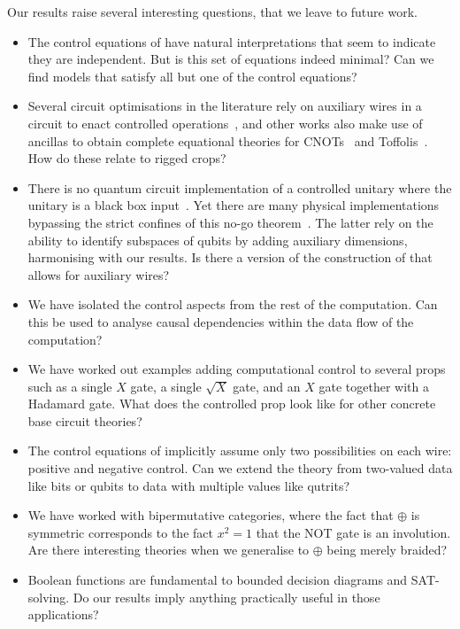 \documentclass[a4paper]{article}
\theoremstyle{plain}
\theoremstyle{definition}
\begin{document}
Our results raise several interesting questions, that we leave to future work.
\begin{itemize}
	\item The control equations of  have natural interpretations that seem to indicate they are independent. But is this set of equations indeed minimal? Can we find models that satisfy all but one of the control equations?

	\item Several circuit optimisations in the literature rely on auxiliary
		wires in a circuit to enact controlled
		operations~\cite{clementetal:minimal,clementetal:extensions}, and other
		works also make use of ancillas to obtain complete equational theories
		for CNOTs~\cite{cockettetal:cnot} and
		Toffolis~\cite{cockettcomfort:tof}. How do these relate to rigged
		crops?

	\item There is no quantum circuit implementation of a controlled unitary where the unitary is a black box input~\cite{araujoetal:nocontrol}. Yet there are many physical implementations bypassing the strict confines of this no-go theorem~\cite{friisetal:unknowncontrol,bisioetal:conditional}. The latter rely on the ability to identify subspaces of qubits by adding auxiliary dimensions, harmonising with our results. Is there a version of the construction of  that allows for auxiliary wires?

	\item We have isolated the control aspects from the rest of the computation. Can this be used to analyse causal dependencies within the data flow of the computation?

	\item We have worked out examples adding computational control to several props such as a single $X$ gate, a single $\sqrt{X}$ gate, and an $X$ gate together with a Hadamard gate. What does the controlled prop look like for other concrete base circuit theories?

	\item The control equations of  implicitly assume only two possibilities on each wire: positive and negative control. Can we extend the theory from two-valued data like bits or qubits to data with multiple values like qutrits?

	\item We have worked with bipermutative categories, where the fact that $\oplus$ is symmetric corresponds to the fact $x^2=1$ that the NOT gate is an involution. Are there interesting theories when we generalise to $\oplus$ being merely braided?

	\item Boolean functions are fundamental to bounded decision diagrams and SAT-solving. Do our results imply anything practically useful in those applications?
\end{itemize}
\end{document}
